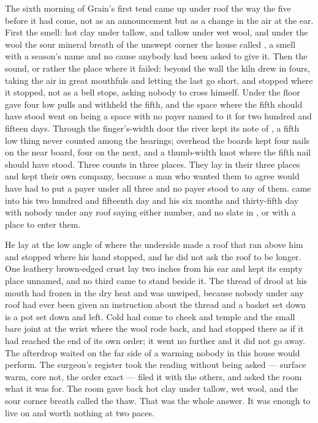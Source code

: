 
The sixth morning of Grain's first tend came up under  roof the way the five before it had come, not as an announcement but as a change in the air at the ear. First the smell: hot clay under tallow, and tallow under wet wool, and under the wool the sour mineral breath of the unswept corner the house called , a smell with a season's name and no cause anybody had been asked to give it. Then the sound, or rather the place where it failed: beyond the wall the kiln drew in fours, taking the air in great mouthfuls and letting the last go short, and stopped where it stopped, not as a bell stops, asking nobody to cross himself. Under the floor  gave four low pulls and withheld the fifth, and the space where the fifth should have stood went on being a space with no payer named to it for two hundred and fifteen days. Through the finger's-width door the river kept its note of , a fifth low thing never counted among the hearings; overhead the boards kept four nails on the near board, four on the next, and a thumb-width knot where the fifth nail should have stood. Three counts in three places. They lay in their three places and kept their own company, because a man who wanted them to agree would have had to put a payer under all three and no payer stood to any of them.  came into his two hundred and fifteenth day and his six months and thirty-fifth day with nobody under any roof saying either number, and no slate in ,  or  with a place to enter them.

He lay at the low angle of  where the underside made a roof that ran above him and stopped where his hand stopped, and he did not ask the roof to be longer. One leathery brown-edged crust lay two inches from his ear and kept its empty place unnamed, and no third came to stand beside it. The thread of drool at his mouth had frozen in the dry heat and was unwiped, because nobody under any roof had ever been given an instruction about the thread and a basket set down is a pot set down and left. Cold had come to cheek and temple and the small bare joint at the wrist where the wool rode back, and had stopped there as if it had reached the end of its own order; it went no further and it did not go away. The afterdrop waited on the far side of a warming nobody in this house would perform. The surgeon's register took the reading without being asked --- surface warm, core not, the order exact --- filed it with the others, and asked the room what it was for. The room gave back hot clay under tallow, wet wool, and the sour corner breath called the thaw. That was the whole answer. It was enough to live on and worth nothing at two paces.


